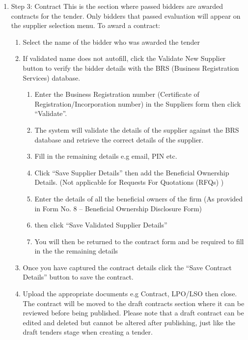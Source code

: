 \documentclass [12pt]{book}
\begin{document}
\begin{enumerate}
\begin{enumerate}
\item{Step 3: Contract}
This is the section where passed bidders are awarded contracts for the tender.
Only bidders that passed evaluation will appear on the supplier selection menu.
To award a contract:

\begin{enumerate}
    \item Select the name of the bidder who was awarded the tender
    \item If validated name does not autofill, click the Validate New Supplier button to verify the bidder details with the BRS (Business Registration Services) database.
    \begin{enumerate}
        \item Enter the Business Registration number (Certificate of Registration/Incorporation number) in the Suppliers form then click “Validate”.
        \item The system will validate the details of the supplier against the BRS database and retrieve the correct details of the supplier.
        \item Fill in the remaining details e.g email, PIN etc.
        \item Click “Save Supplier Details” then add the Beneficial Ownership Details. (Not applicable for Requests For Quotations (RFQs) )
        \item Enter the details of all the beneficial owners of the firm (As provided in Form No. 8 – Beneficial Ownership Disclosure Form)
        \item then click “Save Validated Supplier Details”
        \item You will then be returned to the contract form and be required to fill in the the remaining details
    \end{enumerate}
    
    \item Once you have captured the contract details click the “Save Contract Details” button to save the contract.
    \item Upload the appropriate documents e.g Contract, LPO/LSO then close.\\
    The contract will be moved to the draft contracts section where it can be reviewed before being published.
    Please note that a draft contract can be edited and deleted but cannot be altered after publishing, just like the draft tenders stage when creating a tender. 
\end{enumerate}
    

\end{enumerate}
\end{enumerate}
\end{document}
